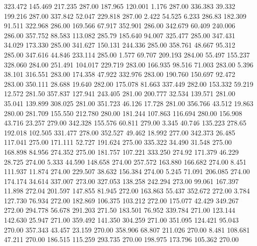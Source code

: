  323.472  145.469  217.235       287.00
 187.965  120.001    1.176       287.00
 336.383   39.332  199.216       287.00
 337.842   52.047  229.818       287.00
   2.422   54.525    6.233       286.83
 182.309   91.511  322.968       286.00
 169.566   67.917  352.901       286.00
 342.679   60.409  240.006       286.00
 357.752   88.583  113.082       285.79
 185.640   94.007  325.477       285.00
 347.431   34.029  173.330       285.00
 341.627  150.131  244.336       285.00
 358.761   48.667   95.312       285.00
 347.616   44.846  233.114       285.00
   1.577   69.707  209.193       284.00
  55.497  155.237  328.060       284.00
 251.491  104.017  229.719       283.00
 166.935   98.516   71.003       283.00
   5.396   38.101  316.551       283.00
 174.358   47.922  332.976       283.00
 190.760  150.697   92.472       283.00
 350.111   28.688   19.640       282.00
 175.078   81.663  337.449       282.00
 153.332   59.219   12.572       281.50
 357.837  127.941  243.405       281.00
 200.777   32.534  139.571       281.00
  35.041  139.899  308.025       281.00
 351.723   46.126   17.728       281.00
 356.766   43.512   19.863       280.00
 281.709  155.550  212.780       280.00
 181.244  107.863  116.694       280.00
 156.908   43.716   23.257       279.00
 342.328  155.576   60.811       279.00
   3.345   40.746  135.223       278.65
 192.018  102.505  331.477       278.00
 352.527   49.462   18.992       277.00
 342.373   26.485  117.041       275.00
 171.111   52.727  191.624       275.00
 335.322   34.490   31.548       275.00
 168.898   84.956  274.352       275.00
 181.757  107.221  333.250       274.92
 171.379   46.229   28.725       274.00
   5.333   44.590  148.658       274.00
 257.572  163.880  166.682       274.00
   8.451  111.937   11.874       274.00
 229.507   38.632  156.384       274.00
   5.245   71.091  206.085       274.00
 174.174   34.614  337.007       273.00
 327.053  138.258  242.294       273.00
  99.061  167.397   11.898       272.04
 201.597  147.855   81.945       272.00
 163.863   55.437  352.672       272.00
   3.784  127.730   76.934       272.00
 182.869  106.375  103.212       272.00
 175.077   42.429  349.267       272.00
 294.778   56.678  291.203       271.50
 183.501   76.952  339.784       271.00
 123.144  142.630   25.947       271.00
 359.492  141.350  304.259       271.00
 351.095  124.421   95.043       270.00
 357.343   43.457   23.159       270.00
 358.906   68.807  211.026       270.00
   8.481  108.681   47.211       270.00
 186.515  115.259  293.735       270.00
 198.975  173.796  105.362       270.00
